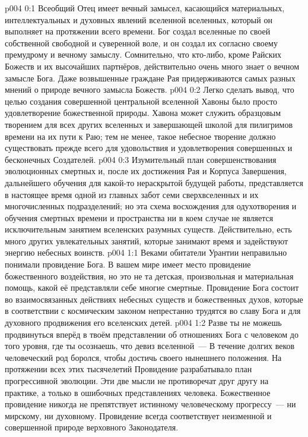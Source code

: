 \author{Божественный Советник}
\vs p004 0:1 Всеобщий Отец имеет вечный замысел, касающийся материальных, интеллектуальных и духовных явлений вселенной вселенных, который он выполняет на протяжении всего времени. Бог создал вселенные по своей собственной свободной и суверенной воле, и он создал их согласно своему премудрому и вечному замыслу. Сомнительно, что кто\hyp{}либо, кроме Райских Божеств и их высочайших партнёров, действительно очень много знает о вечном замысле Бога. Даже возвышенные граждане Рая придерживаются самых разных мнений о природе вечного замысла Божеств.
\vs p004 0:2 Легко сделать вывод, что целью создания совершенной центральной вселенной Хавоны было просто удовлетворение божественной природы. Хавона может служить образцовым творением для всех других вселенных и завершающей школой для пилигримов времени на их пути к Раю; тем не менее, такое небесное творение должно существовать прежде всего для удовольствия и удовлетворения совершенных и бесконечных Создателей.
\vs p004 0:3 Изумительный план совершенствования эволюционных смертных и, после их достижения Рая и Корпуса Завершения, дальнейшего обучения для какой\hyp{}то нераскрытой будущей работы, представляется в настоящее время одной из главных забот семи сверхвселенных и их многочисленных подразделений; но эта схема восхождения для одухотворения и обучения смертных времени и пространства ни в коем случае не является исключительным занятием вселенских разумных существ. Действительно, есть много других увлекательных занятий, которые занимают время и задействуют энергию небесных воинств.
\vs p004 1:1 Веками обитатели Урантии неправильно понимали провидение Бога. В вашем мире имеет место провидение божественного воздействия, но это не та детская, произвольная и материальная помощь, какой её представляли себе многие смертные. Провидение Бога состоит во взаимосвязанных действиях небесных существ и божественных духов, которые в соответствии с космическим законом непрестанно трудятся во славу Бога и для духовного продвижения его вселенских детей.
\vs p004 1:2 Разве ты не можешь продвинуться вперёд в твоём представлении об отношениях Бога с человеком до того уровня, где ты осознаешь, что девиз вселенной~---  В течение долгих веков человеческий род боролся, чтобы достичь своего нынешнего положения. На протяжении всех этих тысячелетий Провидение разрабатывало план прогрессивной эволюции. Эти две мысли не противоречат друг другу на практике, а только в ошибочных представлениях человека. Божественное провидение никогда не препятствует истинному человеческому прогрессу~--- ни мирскому, ни духовному. Провидение всегда соответствует неизменной и совершенной природе верховного Законодателя.
